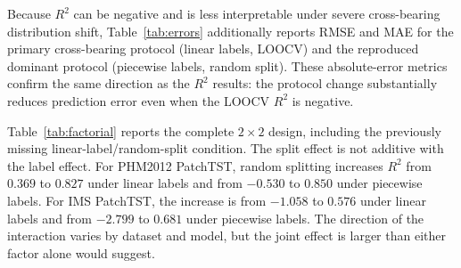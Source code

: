\documentclass[5p,twocolumn]{elsarticle}
\begin{document}
Because $R^2$ can be negative and is less interpretable under severe cross-bearing distribution shift, Table~\ref{tab:errors} additionally reports RMSE and MAE for the primary cross-bearing protocol (linear labels, LOOCV) and the reproduced dominant protocol (piecewise labels, random split). These absolute-error metrics confirm the same direction as the $R^2$ results: the protocol change substantially reduces prediction error even when the LOOCV $R^2$ is negative.

Table~\ref{tab:factorial} reports the complete $2 \times 2$ design, including the previously missing linear-label/random-split condition. The split effect is not additive with the label effect. For PHM2012 PatchTST, random splitting increases $R^2$ from $0.369$ to $0.827$ under linear labels and from $-0.530$ to $0.850$ under piecewise labels. For IMS PatchTST, the increase is from $-1.058$ to $0.576$ under linear labels and from $-2.799$ to $0.681$ under piecewise labels. The direction of the interaction varies by dataset and model, but the joint effect is larger than either factor alone would suggest.

\begin{table}[t]
\centering
\caption{Complete $2 \times 2$ protocol comparison. Values are mean $R^2$; LOOCV values are means across held-out bearings and random values are means across three seeds.}
\label{tab:factorial}
\small
{}
\end{table}
\end{document}
